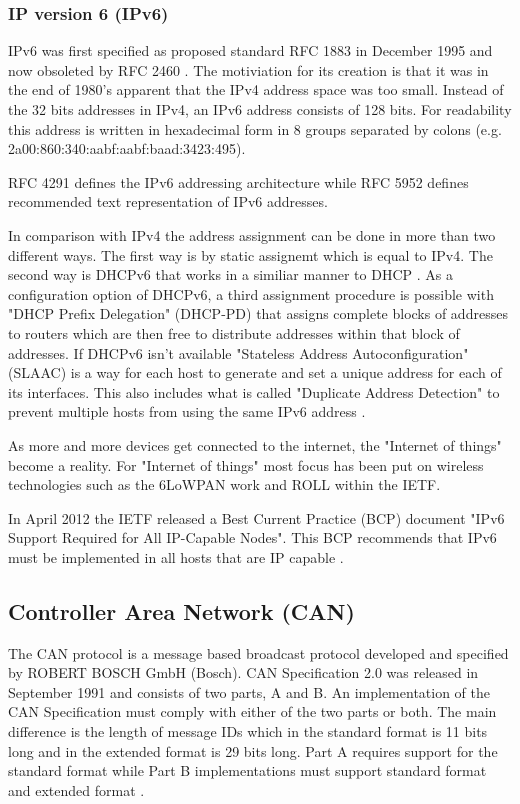 \subsubsection{IP version 6 (IPv6)}
IPv6 was first specified as proposed standard RFC 1883 \cite{web:rfc1883} in
December 1995 and now obsoleted by RFC 2460 \cite{web:rfc2460}. The motiviation for
its creation is that it was in the end of 1980's apparent that the
IPv4 address space was too small. Instead of the 32 bits addresses in IPv4, an
IPv6 address consists of 128 bits. For readability this address is
written in hexadecimal form in 8 groups separated by colons
(e.g. 2a00:860:340:aabf:aabf:baad:3423:495).

RFC 4291 defines the IPv6
addressing architecture \cite{web:rfc4291} while RFC 5952 \cite{web:rfc5952}
defines recommended text representation of IPv6 addresses.

In comparison with IPv4 the address assignment can be done in more than two different
ways. The first way is by static assignemt which is equal to IPv4.
The second way is DHCPv6 that works in a similiar manner
to DHCP \cite{web:rfc3315}. As a configuration option of DHCPv6, a third
assignment procedure is possible with "DHCP
Prefix Delegation" (DHCP-PD) \cite{web:rfc3633} that assigns complete blocks of
addresses to routers which are then free to distribute addresses within that
block of addresses. If DHCPv6 isn't available "Stateless Address
Autoconfiguration" (SLAAC) is a way for each host to generate and set a unique
address for each of its interfaces.
This also includes what is called "Duplicate Address Detection" to prevent
multiple hosts from using the same IPv6 address \cite{web:rfc4862, web:rfc4941}.

As more and more devices get connected to the internet, the "Internet of things" become a
reality. For "Internet of things" most focus has been put on wireless
technologies such as the 6LoWPAN \cite{web:ietf_charter_6lowpan} work and
ROLL \cite{web:ietf_charter_roll} within the IETF.

In April 2012 the IETF released a Best Current Practice (BCP) document
"IPv6 Support Required for All IP-Capable Nodes". This BCP recommends that
IPv6 must be implemented in all hosts that are IP capable \cite{web:rfc6540}.

\subsection{Controller Area Network (CAN)}
The CAN protocol is a message based broadcast protocol developed and specified
by ROBERT BOSCH GmbH (Bosch). CAN Specification 2.0 was released in September
1991 and consists of two parts, A and B. An implementation of the CAN
Specification must comply with either of the two parts or both. The main
difference is the length of message IDs which in the standard format is 11 bits
long and in the extended format is 29 bits long. Part A requires support for
the standard format while Part B implementations must support
standard format and extended format \cite{standard:can_bus}.

